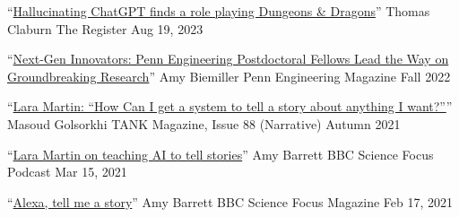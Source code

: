 {\color{black}\fontsize{12pt}{1em}} 







  \cvmedia
    {``\href{https://www.theregister.com/2023/08/19/chatgpt_dnd_dm/}{Hallucinating ChatGPT finds a role playing Dungeons \& Dragons}''} %
    {Thomas Claburn} %
    {The Register} %
    {Aug 19, 2023} %

  \cvmedia
    {``\href{https://magazine.seas.upenn.edu/fall-2022/next-gen-innovators/}{Next-Gen Innovators: Penn Engineering Postdoctoral Fellows Lead the Way on Groundbreaking Research}''} %
    {Amy Biemiller} %
    {Penn Engineering Magazine} %
    {Fall 2022} %

  \cvmedia
    {``\href{https://magazine.tank.tv/issue-88/talk/lara-martin}{Lara Martin: ``How Can I get a system to tell a story about anything I want?''}''} %
    {Masoud Golsorkhi} %
    {TANK Magazine, Issue 88 (Narrative)} %
    {Autumn 2021} %

  \cvmedia
    {``\href{https://www.sciencefocus.com/future-technology/lara-martin-on-teaching-ai-to-tell-stories/}{Lara Martin on teaching AI to tell stories}''} %
    {Amy Barrett} %
    {BBC Science Focus Podcast} %
    {Mar 15, 2021} %

  \cvmedia
    {``\href{https://www.sciencefocus.com/magazine/dark-stars/}{Alexa, tell me a story}''} %
    {Amy Barrett} %
    {BBC Science Focus Magazine} %
    {Feb 17, 2021} %

